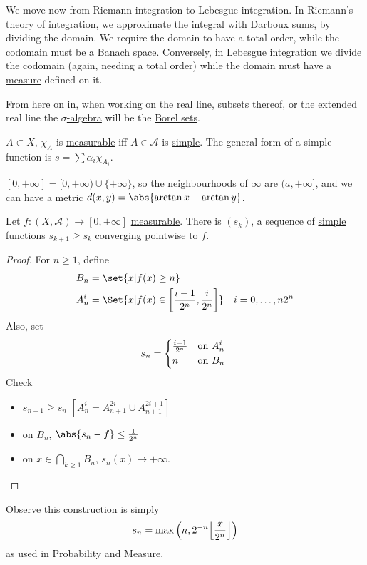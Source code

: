 \documentclass{article}
\DeclarePairedDelimiter{\floor}{\lfloor}{\rfloor}
\begin{document}
We move now from Riemann integration to Lebesgue integration.
In Riemann's theory of integration, we approximate the integral with Darboux sums, by dividing the domain. We require the domain to have a total order, while the codomain must be a Banach space.
Conversely, in Lebesgue integration we divide the codomain (again, needing a total order) while the domain must have a \hyperlink{def:measure}{measure} defined on it.
\begin{defi}[Simple]\hypertarget{def:simple}
    $f: (X, \mathscr{A}) \to (\R, \mathcal{B}(R))$ is \textbf{simple} if it is \hyperlink{def:measure}{measurable} and takes a finite number of values in $[0, +\infty)$.
\end{defi}
From here on in, when working on the real line, subsets thereof, or the extended real line the \hyperlink{def:sigAlg}{$\sigma$-algebra} will be the \hyperlink{def:borelSet}{Borel sets}.
\begin{remark}
    $A \subset X$, $\chi_A$ is \hyperlink{def:measFunc}{measurable} iff $A \in \mathscr{A}$ is \hyperlink{def:simple}{simple}.
    The general form of a simple function is $s = \sum \alpha_i \chi_{A_i}$.
\end{remark}
\begin{notation}
    $[0, +\infty] = [0, +\infty) \cup \{+\infty\}$, so the neighbourhoods of $\infty$ are $(a, +\infty]$, and we can have a metric $d(x,y) = \abs{\arctan x - \arctan y}$.
\end{notation}
\begin{prop}
    Let $f: (X, \mathscr{A}) \to [0, +\infty]$ \hyperlink{def:measFunc}{measurable}.
    There is $(s_k)$, a sequence of \hyperlink{def:simple}{simple} functions $s_{k+1} \geq s_k$ converging pointwise to $f$.
\end{prop}
\begin{proof}
    For $n \geq 1$, define
    \begin{align*}
        B_n &= \set{x | f(x) \geq n}  \\
        A_n^i &= \Set{x | f(x) \in \left[\frac{i-1}{2^n}, \frac{i}{2^n}\right]} \quad i=0, \dotsc, n 2^n
    \end{align*}
    Also, set
    \begin{equation*}
    s_n = \begin{cases*}\frac{i-1}{2^n} & on $A_n^i$ \\ n & on $B_n$\end{cases*}
    \end{equation*}
    Check
    \begin{itemize}
        \item $s_{n+1} \geq s_n$ $[A_n^i = A_{n+1}^{2i} \cup A_{n+1}^{2i+1}]$
        \item on $B_n$, $\abs{s_n - f} \leq \frac{1}{2^n}$
        \item on $x \in \bigcap_{k \geq 1} B_n$, $s_n(x) \to +\infty$.\qedhere
    \end{itemize}
\end{proof}
Observe this construction is simply
\begin{equation*}
    s_n = \max\left(n, 2^{-n} \floor*{\frac{x}{2^{n}}}\right)
\end{equation*}
as used in Probability and Measure.
\end{document}
